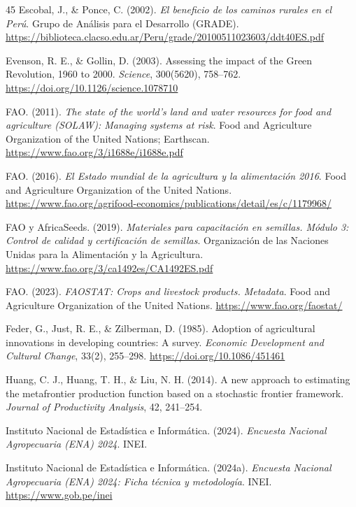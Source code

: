 \documentclass[11pt,a4paper,twocolumn]{article}
\begin{document}
\begin{thebibliography}{45}
Escobal, J., \& Ponce, C. (2002). \textit{El beneficio de los caminos rurales en el Perú}. Grupo de Análisis para el Desarrollo (GRADE). \url{https://biblioteca.clacso.edu.ar/Peru/grade/20100511023603/ddt40ES.pdf}

Evenson, R. E., \& Gollin, D. (2003). Assessing the impact of the Green Revolution, 1960 to 2000. \textit{Science}, 300(5620), 758--762. \url{https://doi.org/10.1126/science.1078710}

FAO. (2011). \textit{The state of the world's land and water resources for food and agriculture (SOLAW): Managing systems at risk}. Food and Agriculture Organization of the United Nations; Earthscan. \url{https://www.fao.org/3/i1688e/i1688e.pdf}

FAO. (2016). \textit{El Estado mundial de la agricultura y la alimentación 2016}. Food and Agriculture Organization of the United Nations. \url{https://www.fao.org/agrifood-economics/publications/detail/es/c/1179968/}

FAO y AfricaSeeds. (2019). \textit{Materiales para capacitación en semillas. Módulo 3: Control de calidad y certificación de semillas}. Organización de las Naciones Unidas para la Alimentación y la Agricultura. \url{https://www.fao.org/3/ca1492es/CA1492ES.pdf}

FAO. (2023). \textit{FAOSTAT: Crops and livestock products. Metadata}. Food and Agriculture Organization of the United Nations. \url{https://www.fao.org/faostat/}

Feder, G., Just, R. E., \& Zilberman, D. (1985). Adoption of agricultural innovations in developing countries: A survey. \textit{Economic Development and Cultural Change}, 33(2), 255--298. \url{https://doi.org/10.1086/451461}

Huang, C. J., Huang, T. H., \& Liu, N. H. (2014). A new approach to estimating the metafrontier production function based on a stochastic frontier framework. \textit{Journal of Productivity Analysis}, 42, 241--254.

Instituto Nacional de Estadística e Informática. (2024). \textit{Encuesta Nacional Agropecuaria (ENA) 2024}. INEI.

Instituto Nacional de Estadística e Informática. (2024a). \textit{Encuesta Nacional Agropecuaria (ENA) 2024: Ficha técnica y metodología}. INEI. \url{https://www.gob.pe/inei}


\end{thebibliography}
\end{document}
